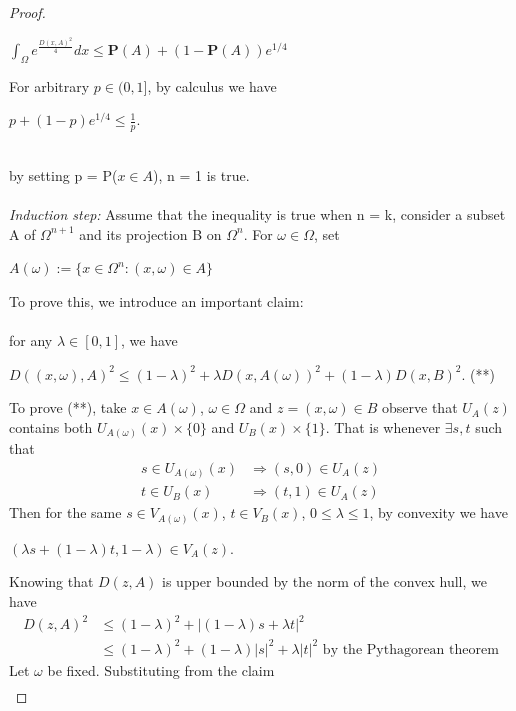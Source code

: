 \documentclass{article}
\begin{document}
\begin{proof}
    \begin{center}
        $\int_{\Omega}{e^{\frac{D(x,A)^2}{4}}dx} \leq \mathbf{P}(A)+(1-\mathbf{P}(A))e^{1/4}$
    \end{center}
    For arbitrary $p \in (0,1]$, by calculus we have \\
    \centerline{$p + (1-p)e^{1/4} \leq \frac{1}{p}$.}
    \\
    by setting p = P($x\in A$), n = 1 is true.\\
    \\
    \textit{Induction step:} Assume that the inequality is true when n = k, consider a subset A of $\Omega^{n+1}$ and its projection B on $\Omega^n$. For $\omega \in \Omega$, set
    \begin{center}
        $A(\omega) := \{x\in \Omega^n:(x, \omega) \in A\}$
    \end{center}
    To prove this, we introduce an important claim:\\
    \\
    for any $\lambda \in [0, 1]$, we have
    \begin{center}
       $D((x,\omega),A)^2 \leq (1-\lambda)^2 + \lambda D(x, A(\omega))^2 + (1-\lambda)D(x,B)^2.$  (**)
    \end{center}
    To prove (**), take $x \in A(\omega)$, $\omega \in \Omega$ and $z = (x, \omega) \in B$ observe that $U_A(z)$ contains both $U_{A(\omega)}(x) \times \{0\}$ and $U_B(x) \times \{1\}$. That is whenever $\exists s, t$ such that
    \begin{align*}
        s \in U_{A(\omega)}(x) &\Rightarrow (s, 0) \in U_A(z) \\
        t \in U_B(x) &\Rightarrow (t, 1) \in U_A(z)
    \end{align*}
    Then for the same $s \in V_{A(\omega)}(x)$, $t \in V_B(x)$, $0 \leq \lambda \leq 1$, by convexity we have
    \begin{center}
        $(\lambda s + (1-\lambda)t, 1-\lambda) \in V_A(z).$
    \end{center}
    Knowing that $D(z, A)$ is upper bounded by the norm of the convex hull, we have
    \begin{align*}
        D(z,A)^2 & \leq (1-\lambda)^2 + |(1-\lambda)s + \lambda t|^2\\
                &\leq (1-\lambda)^2 + (1-\lambda)|s|^2 + \lambda |t|^2 \text{  by the Pythagorean theorem}
    \end{align*}
    Let $\omega$ be fixed. Substituting from the claim
    \begin{align*}

\end{align*}
\end{proof}
\end{document}
